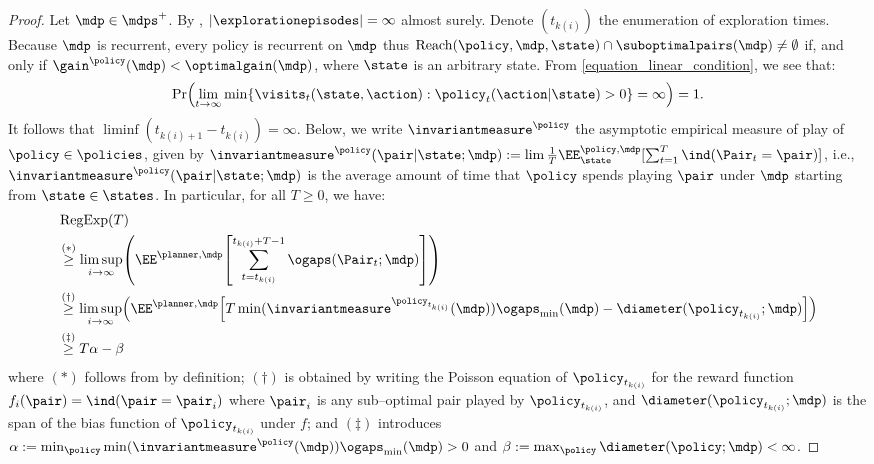 \documentclass[preprint,cleveref,12pt]{colt2025}
\DeclarePairedDelimiter{\braces}{\{}{\}}	%
\DeclarePairedDelimiter{\brackets}{[}{]}	%
\DeclarePairedDelimiter{\parens}{(}{)}	%
\DeclarePairedDelimiter{\abs}{\lvert}{\rvert}	%
\newcommand{\indic}[1]{\ind\parens{#1}}
\def\indicator{\indic}
\def\model{\mdp}
\def\models{\mdps}
\def\optgain{\optimalgain} %
\def\imeasure{\invariantmeasure}
\DeclareMathOperator{\RegExp}{\mathrm{RegExp}}
\def\Reach{\mathrm{Reach}}
\begin{document}
    \begin{proof}
        Let $\model \in \models^+$.
        By , $\abs*{\explorationepisodes} = \infty$ almost surely. 
        Denote $(t_{k(i)})$ the enumeration of exploration times. 
        Because $\model$ is recurrent, every policy is recurrent on $\model$ thus $\Reach(\policy, \model, \state) \cap \suboptimalpairs(\model) \ne \emptyset$ if, and only if $\gain^\policy(\model) < \optgain(\model)$, where $\state$ is an arbitrary state.
        From \eqref{equation_linear_condition}, we see that:
        \begin{equation}
            \Pr \parens*{
                \lim_{t \to \infty} 
                \min \braces*{\visits_t(\state, \action): \policy_t(\action|\state) > 0}
                =
                \infty
            }
            =
            1.
        \end{equation}
        It follows that $\liminf (t_{k(i)+1} - t_{k(i)}) = \infty$. 
        Below, we write $\imeasure^\policy$ the asymptotic empirical measure of play of $\policy \in \policies$, given by $\imeasure^\policy(\pair|\state; \model) := \lim \frac 1T \EE_{\state}^{\policy, \model}[\sum_{t=1}^T \indicator{\Pair_t = \pair}]$, i.e., $\imeasure^\policy(\pair|\state; \model)$ is the average amount of time that $\policy$ spends playing $\pair$ under $\model$ starting from $\state \in \states$.
        In particular, for all $T \ge 0$, we have:
        \begin{align*}
            & \RegExp(T) 
            \\
            & \overset{(*)}\ge
            \limsup_{i \to \infty}
            \parens*{
                \EE^{\planner, \model} \brackets*{
                    \sum_{t=t_{k(i)}}^{t_{k(i)}+T-1}
                    \ogaps(\Pair_t; \model)
                }
            }
            \\
            & \overset{(\dagger)}\ge
            \limsup_{i \to \infty}
            \parens*{
                \EE^{\planner, \model} \brackets*{
                    T \min(\imeasure^{\policy_{t_{k(i)}}}(\model))
                    \ogaps_\mathrm{min}(\model)
                    - \diameter(\policy_{t_{k(i)}}; \model)
                }
            }
            \\ 
            & \overset{(\ddagger)} \ge
            T \alpha - \beta
        \end{align*}
        where
        $(*)$ follows from by definition;
        $(\dagger)$ is obtained by writing the Poisson equation of $\policy_{t_{k(i)}}$ for the reward function $f_i(\pair) = \indicator{\pair = \pair_i}$ where $\pair_i$ is any sub--optimal pair played by $\policy_{t_{k(i)}}$, and $\diameter(\policy_{t_{k(i)}}; \model)$ is the span of the bias function of $\policy_{t_{k(i)}}$ under $f$; and
        $(\ddagger)$ introduces $\alpha := \min_{\policy} \min(\imeasure^\policy(\model)) \ogaps_\mathrm{\min}(\model) > 0$ and $\beta := \max_{\policy} \diameter(\policy; \model) < \infty$. 
    \end{proof}
\end{document}
